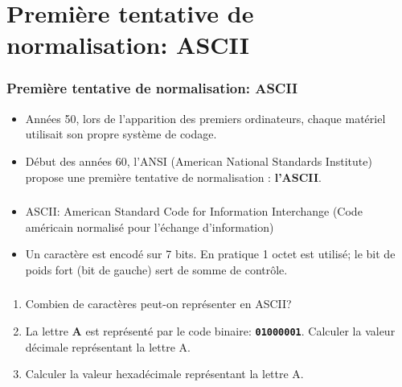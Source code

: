 \documentclass[svgnames,11pt]{beamer}
\begin{document}
\section{Première tentative de normalisation: ASCII}
\begin{frame}
    \frametitle{Première tentative de normalisation: ASCII}

    \begin{itemize}
        \item <1-> Années 50, lors de l’apparition des premiers ordinateurs, chaque matériel utilisait son propre système de codage.
        \item <2-> Début des années 60, l'ANSI (American National Standards Institute) propose une première tentative de normalisation : \textbf{l’ASCII}.
    \end{itemize}

\end{frame}
\begin{frame}
    \frametitle{}

   \begin{aretenir}[]
    \begin{itemize}
        \item ASCII: American Standard Code for Information Interchange (Code américain normalisé pour l'échange d'information)
        \item Un caractère est encodé sur 7 bits. En pratique 1 octet est utilisé; le bit de poids fort (bit de gauche) sert de somme de contrôle.
    \end{itemize}
   \end{aretenir}

\end{frame}
\begin{frame}
    \frametitle{}

    \begin{activite}
    \begin{enumerate}
        \item Combien de caractères peut-on représenter en ASCII?
        \item La lettre \textbf{A} est représenté par le code binaire: \texttt{\textbf{01000001}}. Calculer la valeur décimale représentant la lettre A.
        \item Calculer la valeur hexadécimale représentant la lettre A.
    \end{enumerate}
    \end{activite}

\end{frame}
\end{document}

